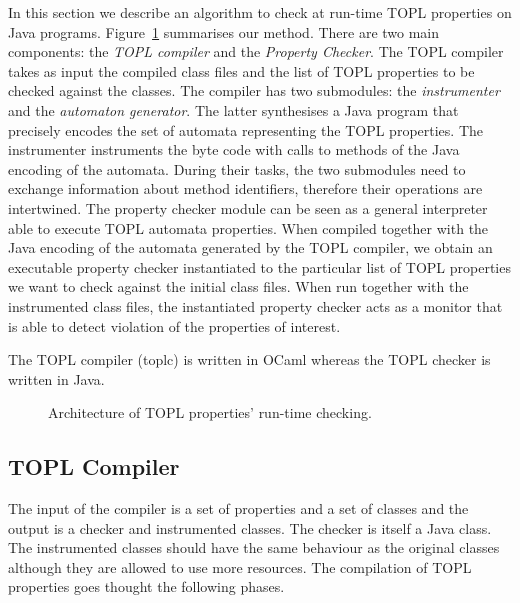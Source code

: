 \documentclass{sigplanconf}[10pt] %
\begin{document}
In this section we describe an algorithm to check at run-time  TOPL properties on Java programs.
Figure~\ref{architecture} summarises our method.
There are two main components:
the {\em TOPL compiler} and the {\em Property Checker}.
The TOPL compiler takes as input the compiled class files and the list of TOPL properties to be checked against the classes.
The compiler has two submodules: the {\em instrumenter} and the {\em automaton generator}.
The latter synthesises a Java program that precisely encodes the set of automata representing the TOPL properties.
The instrumenter instruments the byte code with calls to methods of the Java encoding of the automata.
During their tasks, the two submodules need to exchange information about method identifiers, therefore their operations are intertwined.
The property checker module can be seen as a general interpreter able to execute TOPL automata properties.
When compiled together with the Java encoding of the automata generated by the TOPL compiler, we obtain an executable property checker instantiated to the particular list of TOPL properties we want to check against the initial class files.
When run together with the instrumented class files, the instantiated property checker acts as a monitor that is able to detect violation of the properties of interest.

The TOPL compiler (\textsf{toplc}) is written in OCaml whereas  the TOPL checker is written in Java.

\begin{figure}[htbp]
\begin{center}

\caption{Architecture of TOPL properties' run-time checking.}
\label{architecture}
\end{center}
\end{figure}

\subsection{TOPL Compiler} %

The input of the compiler is a set of properties and a set of classes and the output  is a checker and instrumented classes.
The checker is itself a Java class.
The instrumented classes should have the same behaviour as the original classes although they are allowed to use more resources.
The compilation of TOPL properties goes thought the following phases.
\end{document}
